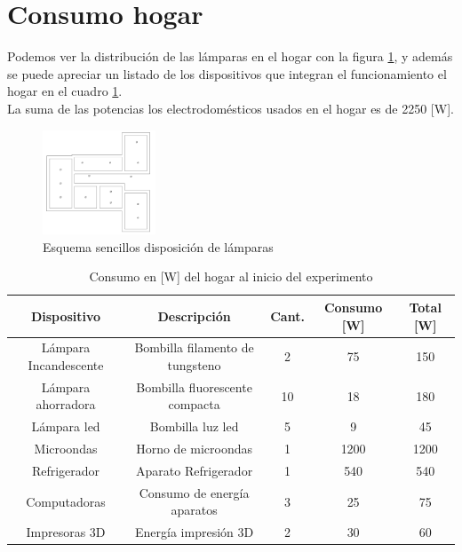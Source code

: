 \documentclass[]{article}
\begin{document}
\section{Consumo hogar}

Podemos ver la distribución de las lámparas en el hogar con la figura \ref{fig:lámparas}, y además se puede apreciar un listado de los dispositivos que integran el funcionamiento el hogar en el cuadro \ref{tablaConsumo}.\\

La suma de las potencias los electrodomésticos usados en el hogar es de 2250 [W].\\


\begin{figure}
    \centering
    \includegraphics[width=0.3\textwidth]{Croquis}
    \caption{Esquema sencillos disposición de lámparas}
    \label{fig:lámparas}
\end{figure}




\begin{table}[h!]
\centering

\begin{tabular}{|c|c|c|c|c|}
\hline
Dispositivo           & Descripción                     & Cant. & Consumo {[}W{]} & Total [W] \\ \hline
Lámpara Incandescente & Bombilla filamento de tungsteno & 2                  & 75              & 150           \\ \hline
Lámpara ahorradora    & Bombilla fluorescente compacta  & 10                 & 18              & 180           \\ \hline
Lámpara led           & Bombilla luz led                & 5                  & 9               & 45            \\ \hline
Microondas            & Horno de microondas             & 1                  & 1200            & 1200          \\ \hline
Refrigerador          & Aparato Refrigerador            & 1                  & 540             & 540           \\ \hline
Computadoras          & Consumo de energía aparatos     & 3                  & 25              & 75            \\ \hline
Impresoras 3D         & Energía impresión 3D            & 2                  & 30              & 60            \\ \hline
\end{tabular}
\caption{Consumo en [W] del hogar al inicio del experimento}
\label{tablaConsumo}
\end{table}
\end{document}
